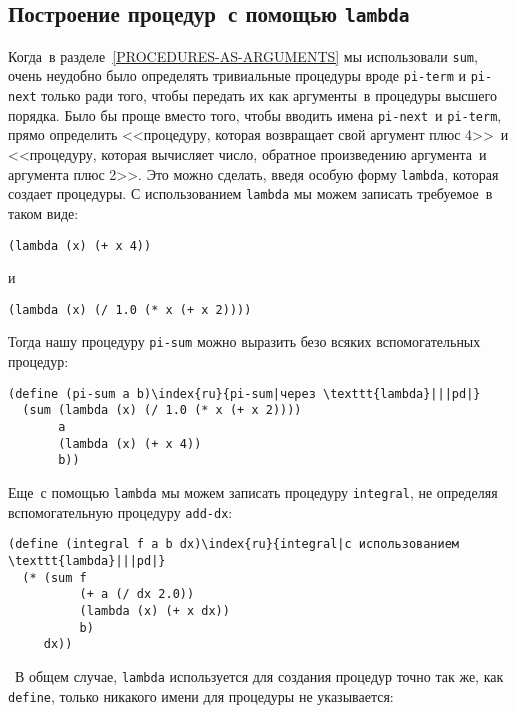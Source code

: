 \subsection{Построение процедур~с помощью {\tt lambda}}
\label{CONSTRUCTING-PROCEDURES-USING-LAMBDA}


Когда~в разделе~\ref{PROCEDURES-AS-ARGUMENTS}
мы использовали {\tt sum}, очень неудобно было
определять тривиальные процедуры вроде {\tt pi-term} 
и {\tt pi-next} только ради того, чтобы передать их как
аргументы~в процедуры высшего порядка.  Было бы проще вместо того, чтобы
вводить имена {\tt pi-next}~и {\tt pi-term}, прямо
определить <<процедуру, которая 
возвращает свой аргумент плюс 4>>~и <<процедуру, которая вычисляет
число, обратное произведению аргумента~и аргумента плюс 2>>.  Это
можно сделать, введя особую форму {\tt lambda},
которая создает процедуры. С использованием {\tt lambda} мы можем
записать требуемое~в таком виде:

\begin{Verbatim}[fontsize=\small]
(lambda (x) (+ x 4))
\end{Verbatim}
и

\begin{Verbatim}[fontsize=\small]
(lambda (x) (/ 1.0 (* x (+ x 2))))
\end{Verbatim}
Тогда нашу процедуру {\tt pi-sum} можно выразить безо всяких
вспомогательных процедур:

\begin{Verbatim}[fontsize=\small]
(define (pi-sum a b)\index{ru}{pi-sum|через \texttt{lambda}|||pd|}
  (sum (lambda (x) (/ 1.0 (* x (+ x 2))))
       a
       (lambda (x) (+ x 4))
       b))
\end{Verbatim}

Еще~с помощью {\tt lambda} мы можем записать
процедуру {\tt integral}, не определяя вспомогательную
процедуру {\tt add-dx}:

\begin{Verbatim}[fontsize=\small]
(define (integral f a b dx)\index{ru}{integral|с использованием \texttt{lambda}|||pd|}
  (* (sum f
          (+ a (/ dx 2.0))
          (lambda (x) (+ x dx))
          b)
     dx))
\end{Verbatim}

~В общем случае, {\tt lambda} 
используется для
создания процедур точно так же, как {\tt define}, только
никакого имени для процедуры не указывается:

